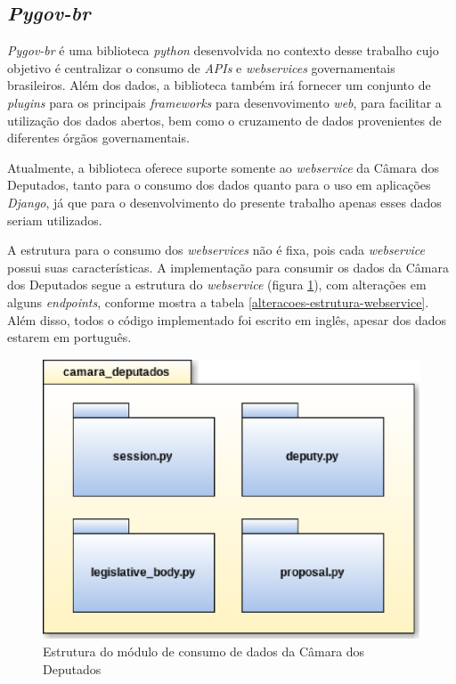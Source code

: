 \subsection{\textit{Pygov-br}}

\textit{Pygov-br} é uma biblioteca \textit{python} desenvolvida no contexto desse trabalho cujo objetivo é centralizar o consumo de \textit{APIs} e \textit{webservices} governamentais brasileiros. Além dos dados, a biblioteca também irá fornecer um conjunto de \textit{plugins} para os principais \textit{frameworks} para desenvovimento \textit{web}, para facilitar a utilização dos dados abertos, bem como o cruzamento de dados provenientes de diferentes órgãos governamentais.

Atualmente, a biblioteca oferece suporte somente ao \textit{webservice} da Câmara dos Deputados, tanto para o consumo dos dados quanto para o uso em aplicações \textit{Django}, já que para o desenvolvimento do presente trabalho apenas esses dados seriam utilizados.

A estrutura para o consumo dos \textit{webservices} não é fixa, pois cada \textit{webservice} possui suas características. A implementação para consumir os dados da Câmara dos Deputados segue a estrutura do \textit{webservice} (figura \ref{estrutua_camara_deputados}), com alterações em alguns \textit{endpoints}, conforme mostra a tabela \ref{alteracoes-estrutura-webservice}. Além disso, todos o código implementado foi escrito em inglês, apesar dos dados estarem em português.

\begin{figure}[h]
    \centering
    \includegraphics[scale=0.5]{figuras/camara_deputados.eps}
    \caption{Estrutura do módulo de consumo de dados da Câmara dos Deputados}
    \label{estrutua_camara_deputados}
\end{figure}

